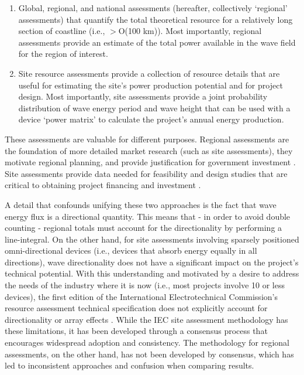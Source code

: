 \begin{enumerate}
\item Global, regional, and national assessments (hereafter, collectively ‘regional’ assessments) that quantify the total theoretical resource for a relatively long section of coastline (i.e., $>$O(100 km)). Most importantly, regional assessments provide an estimate of the total power available in the wave field for the region of interest.
\item Site resource assessments provide a collection of resource details that are useful for estimating the site’s power production potential and for project design. Most importantly, site assessments provide a joint probability distribution of wave energy period and wave height that can be used with a device ‘power matrix’ to calculate the project’s annual energy production.
\end{enumerate}

These assessments are valuable for different purposes. Regional assessments are the foundation of more detailed market research (such as site assessments), they motivate regional planning, and provide justification for government investment \citep[e.g., ][]{EPRIwaveresource2011,gunnQuantifyingGlobalWave2012,regueroGlobalWavePower2015,motaWaveEnergyPotential2014}. Site assessments provide data needed for feasibility and design studies that are critical to obtaining project financing and investment \citep[]{robertsonCharacterizingShoreWave2014,iglesiasWaveEnergyPotential2009}.

A detail that confounds unifying these two approaches is the fact that wave energy flux is a directional quantity. This means that - in order to avoid double counting - regional totals must account for the directionality by performing a line-integral. On the other hand, for site assessments involving sparsely positioned omni-directional devices (i.e., devices that absorb energy equally in all directions), wave directionality does not have a significant impact on the project’s technical potential. With this understanding and motivated by a desire to address the needs of the industry where it is now (i.e., most projects involve 10 or less devices), the first edition of the International Electrotechnical Commission’s resource assessment technical specification does not explicitly account for directionality or array effects \citep[]{internationalelectrotechnicalcommissionPart101Wave2015}. While the IEC site assessment methodology has these limitations, it has been developed through a consensus process that encourages widespread adoption and consistency. The methodology for regional assessments, on the other hand, has not been developed by consensus, which has led to inconsistent approaches and confusion when comparing results.

